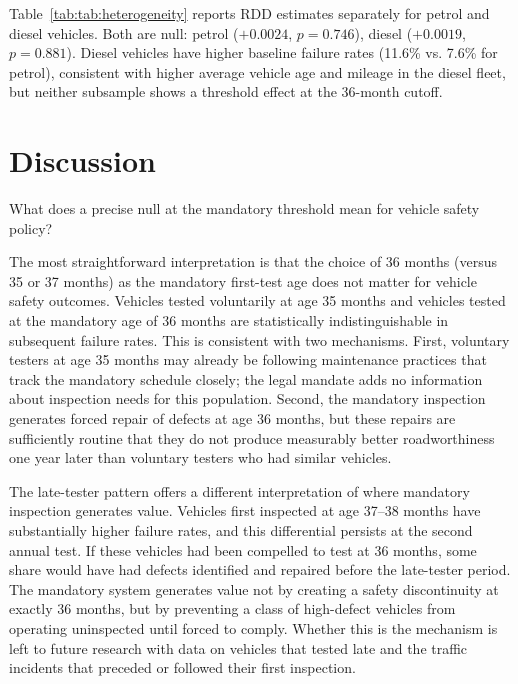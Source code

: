 \documentclass[12pt]{article}
\begin{document}
Table~\ref{tab:tab:heterogeneity} reports RDD estimates separately for petrol and diesel vehicles. Both are null: petrol ($+0.0024$, $p = 0.746$), diesel ($+0.0019$, $p = 0.881$). Diesel vehicles have higher baseline failure rates (11.6\% vs. 7.6\% for petrol), consistent with higher average vehicle age and mileage in the diesel fleet, but neither subsample shows a threshold effect at the 36-month cutoff.



\section{Discussion}

What does a precise null at the mandatory threshold mean for vehicle safety policy?

The most straightforward interpretation is that the choice of 36 months (versus 35 or 37 months) as the mandatory first-test age does not matter for vehicle safety outcomes. Vehicles tested voluntarily at age 35 months and vehicles tested at the mandatory age of 36 months are statistically indistinguishable in subsequent failure rates. This is consistent with two mechanisms. First, voluntary testers at age 35 months may already be following maintenance practices that track the mandatory schedule closely; the legal mandate adds no information about inspection needs for this population. Second, the mandatory inspection generates forced repair of defects at age 36 months, but these repairs are sufficiently routine that they do not produce measurably better roadworthiness one year later than voluntary testers who had similar vehicles.

The late-tester pattern offers a different interpretation of where mandatory inspection generates value. Vehicles first inspected at age 37--38 months have substantially higher failure rates, and this differential persists at the second annual test. If these vehicles had been compelled to test at 36 months, some share would have had defects identified and repaired before the late-tester period. The mandatory system generates value not by creating a safety discontinuity at exactly 36 months, but by preventing a class of high-defect vehicles from operating uninspected until forced to comply. Whether this is the mechanism is left to future research with data on vehicles that tested late and the traffic incidents that preceded or followed their first inspection.
\end{document}
